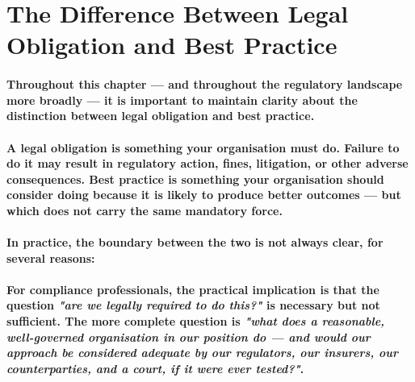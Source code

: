 \section{The Difference Between Legal Obligation and Best Practice}
\paragraph{Throughout this chapter — and throughout the regulatory landscape more broadly — it is important to maintain clarity about the distinction between \textbf{legal obligation} and \textbf{best practice}.}
\paragraph{A legal obligation is something your organisation must do. Failure to do it may result in regulatory action, fines, litigation, or other adverse consequences. Best practice is something your organisation should consider doing because it is likely to produce better outcomes — but which does not carry the same mandatory force.}
\paragraph{In practice, the boundary between the two is not always clear, for several reasons:}
\begin{itemize}
\end{itemize}
\paragraph{For compliance professionals, the practical implication is that the question \textit{"are we legally required to do this?"} is necessary but not sufficient. The more complete question is \textit{"what does a reasonable, well-governed organisation in our position do — and would our approach be considered adequate by our regulators, our insurers, our counterparties, and a court, if it were ever tested?"}.}

